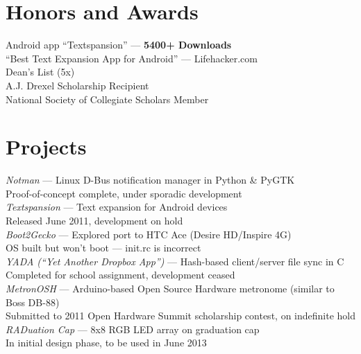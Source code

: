 \documentclass[10pt]{barag_resume}
\begin{document}
	\newpage
	\section{Honors and Awards}%
		Android app ``Textspansion'' --- \textbf{5400+ Downloads}\\ {\setlength{\parindent}{1em}
			\indent ``Best Text Expansion App for Android'' --- Lifehacker.com\\
		Dean's List (5x)\\
		A.J. Drexel Scholarship Recipient\\
		National Society of Collegiate Scholars Member}


	\section{Projects}%
		{\large \emph{Notman}} --- Linux D-Bus notification manager in Python \& PyGTK\\{\setlength{\parindent}{1em}
			\indent Proof-of-concept complete, under sporadic development\\
		{\large \emph{Textspansion}} --- Text expansion for Android devices\\
			\indent Released June 2011, development on hold\\
		{\large \emph{Boot2Gecko}} --- Explored port to HTC Ace (Desire HD/Inspire 4G)\\
			\indent OS built but won't boot --- init.rc is incorrect\\
		{\large \emph{YADA (``Yet Another Dropbox App'')}} --- Hash-based client/server file sync in C\\
			\indent Completed for school assignment, development ceased\\
		{\large \emph{MetronOSH}} --- Arduino-based Open Source Hardware metronome (similar to Boss DB-88)\\
			\indent Submitted to 2011 Open Hardware Summit scholarship contest, on indefinite hold\\
		{\large \emph{RADuation Cap}} --- 8x8 RGB LED array on graduation cap\\
			\indent In initial design phase, to be used in June 2013}
\end{document}
